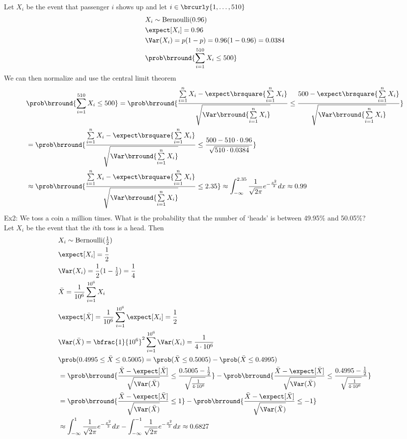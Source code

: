 Let $X_i$ be the event that passenger $i$ shows up and let $i\in\brcurly{1,\ldots,510}$
\begin{align*}
    &X_i\sim\mathrm{Bernoulli}(0.96)\\
    &\expect[X_i]=0.96\\
    &\Var(X_i)=p(1-p)=0.96(1-0.96)=0.0384\\
    &\prob\brround{\sum_{i=1}^{510}X_i\leq 500}
\end{align*}
We can then normalize and use the central limit theorem
\begin{align*}
    &\prob\brround{\sum_{i=1}^{510}X_i\leq 500}=\prob\brround{\frac{\sum\limits_{i=1}^nX_i-\expect\brsquare{\sum\limits_{i=1}^n X_i}}{\sqrt{\Var\brround{\sum\limits_{i=1}^n X_i}}}\leq\frac{500-\expect\brsquare{\sum\limits_{i=1}^n X_i}}{\sqrt{\Var\brround{\sum\limits_{i=1}^n X_i}}}}\\
    &=\prob\brround{\frac{\sum\limits_{i=1}^nX_i-\expect\brsquare{\sum\limits_{i=1}^n X_i}}{\sqrt{\Var\brround{\sum\limits_{i=1}^n X_i}}}\leq\frac{500-510\cdot0.96}{\sqrt{510\cdot0.0384}}}\\
    &\approx\prob\brround{\frac{\sum\limits_{i=1}^nX_i-\expect\brsquare{\sum\limits_{i=1}^n X_i}}{\sqrt{\Var\brround{\sum\limits_{i=1}^n X_i}}}\leq 2.35}\approx\int_{-\infty}^{2.35}\frac{1}{\sqrt{2\pi}}e^{-\frac{x^2}{2}}dx\approx 0.99
\end{align*}
Ex2: We toss a coin a million times. What is the probability that the number of `heads' is between 49.95\% and 50.05\%?\\
Let $X_i$ be the event that the $i$th toss is a head. Then
\begin{align*}
    &X_i\sim\mathrm{Bernoulli}(\tfrac{1}{2})\\
    &\expect[X_i]=\frac{1}{2}\\
    &\Var(X_i)=\frac{1}{2}(1-\tfrac{1}{2})=\frac{1}{4}\\
    &\bar{X}=\frac{1}{10^6}\sum_{i=1}^{10^6}X_i\\
    &\expect[\bar{X}]=\frac{1}{10^6}\sum_{i=1}^{10^6}\expect[X_i]=\frac{1}{2}\\
    &\Var(\bar{X})=\bfrac{1}{10^{6}}^2\sum_{i=1}^{10^6}\Var(X_i)=\frac{1}{4\cdot10^6}\\
    &\prob(0.4995\leq\bar{X}\leq0.5005)=\prob(\bar{X}\leq0.5005)-\prob(\bar{X}\leq0.4995)\\
    &=\prob\brround{\frac{\bar{X}-\expect[\bar{X}]}{\sqrt{\Var(\bar{X})}}\leq\frac{0.5005-\frac{1}{2}}{\sqrt{\frac{1}{4\cdot 10^6}}}}-\prob\brround{\frac{\bar{X}-\expect[\bar{X}]}{\sqrt{\Var(\bar{X})}}\leq\frac{0.4995-\frac{1}{2}}{\sqrt{\frac{1}{4\cdot 10^6}}}}\\
    &=\prob\brround{\frac{\bar{X}-\expect[\bar{X}]}{\sqrt{\Var(\bar{X})}}\leq1}-\prob\brround{\frac{\bar{X}-\expect[\bar{X}]}{\sqrt{\Var(\bar{X})}}\leq-1}\\
    &\approx\int_{-\infty}^1\frac{1}{\sqrt{2\pi}}e^{-\frac{x^2}{2}}dx-\int_{-\infty}^{-1}\frac{1}{\sqrt{2\pi}}e^{-\frac{x^2}{2}}dx\approx 0.6827
\end{align*}

